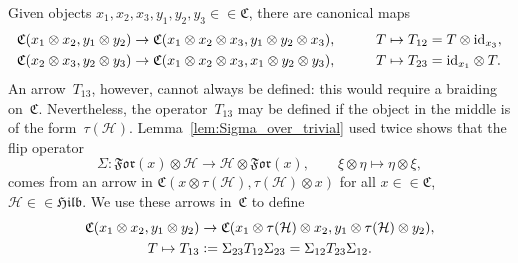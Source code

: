 \documentclass[a4paper]{amsart}
\numberwithin{equation}{section}
\theoremstyle{plain}
\numberwithin{theorem}{section}
\theoremstyle{definition}
\theoremstyle{remark}
\newcommand*{\inOb}{\mathrel{\in\in}}%
\newcommand*{\Cat}{\mathfrak C}     %
\newcommand*{\Hilb}{\mathfrak{Hilb}}%
\newcommand*{\Forget}{\mathfrak{For}}%
\newcommand*{\Trivial}{\tau}%
\newcommand*{\Id}{\textup{id}}%
\newcommand*{\Hils}[1][H]{\mathcal{#1}}%
\newcommand*{\defeq}{\mathrel{\vcentcolon=}}
\begin{document}
Given objects \(x_1,x_2,x_3,y_1,y_2,y_3\inOb\Cat\), there are
canonical maps
\begin{alignat*}{2}
  \Cat(x_1\otimes x_2,y_1\otimes y_2) &\to
  \Cat(x_1\otimes x_2\otimes x_3,y_1\otimes y_2\otimes x_3),
  &\qquad
  T&\mapsto T_{12} = T\otimes \Id_{x_3},\\
  \Cat(x_2\otimes x_3,y_2\otimes y_3) &\to
  \Cat(x_1\otimes x_2\otimes x_3,x_1\otimes y_2\otimes y_3),
  &\qquad
  T&\mapsto T_{23} = \Id_{x_1} \otimes T.
\end{alignat*}
An arrow~\(T_{13}\),
however, cannot always be defined: this would require a
braiding on~\(\Cat\).
Nevertheless, the operator~\(T_{13}\)
may be defined if the object in the middle is of the
form~\(\Trivial(\Hils)\).
Lemma~\ref{lem:Sigma_over_trivial} used twice shows that the flip
operator
\[
\Sigma\colon \Forget(x)\otimes\Hils \to \Hils \otimes \Forget(x),
\qquad \xi\otimes\eta\mapsto \eta\otimes\xi,
\]
comes from an arrow in
\(\Cat(x\otimes\Trivial(\Hils), \Trivial(\Hils) \otimes x)\)
for all \(x\inOb\Cat\),
\(\Hils\inOb\Hilb\).  We use these arrows in~\(\Cat\) to define
\begin{multline*}
  \Cat(x_1\otimes x_2,y_1\otimes y_2) \to
  \Cat(x_1\otimes \Trivial(\Hils)\otimes x_2,y_1\otimes
  \Trivial(\Hils)\otimes y_2),\\
  T\mapsto T_{13} \defeq \Sigma_{23} T_{12} \Sigma_{23}
  = \Sigma_{12} T_{23} \Sigma_{12}.
\end{multline*}
\end{document}
